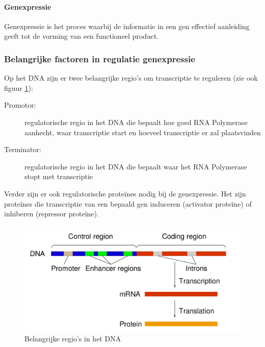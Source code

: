 \documentclass[a4paper,kul]{kulakarticle} %
\begin{document}
\paragraph{Genexpressie}
Genexpressie is het proces waarbij de informatie in een gen effectief aanleiding geeft tot de vorming van een functioneel product. 
\subsubsection{Belangrijke factoren in regulatie genexpressie}
Op het DNA zijn er twee belangrijke regio's om transcriptie te reguleren (zie ook figuur \ref{fig:belangrijkeregiodna}):
\begin{description}
	\item[Promotor:] regulatorische regio in het DNA die bepaalt hoe goed RNA Polymerase aanhecht, waar transcriptie start en hoeveel transcriptie er zal plaatsvinden
	\item[Terminator:] regulatorische regio in het DNA die bepaalt waar het RNA Polymerase stopt met transcriptie
\end{description} 
Verder zijn er ook regulatorische proteïnes nodig bij de genexpressie. Het zijn proteïnes die transcriptie van een bepaald gen induceren (activator proteïne) of inhiberen (repressor proteïne).
\begin{figure}[h]
	\centering
	\includegraphics[width=0.7\linewidth]{BelangrijkeRegioDNA}
	\caption[Belangrijke regio DNA]{Belangrijke regio's in het DNA}
	\label{fig:belangrijkeregiodna}
\end{figure}
\newpage
\end{document}
